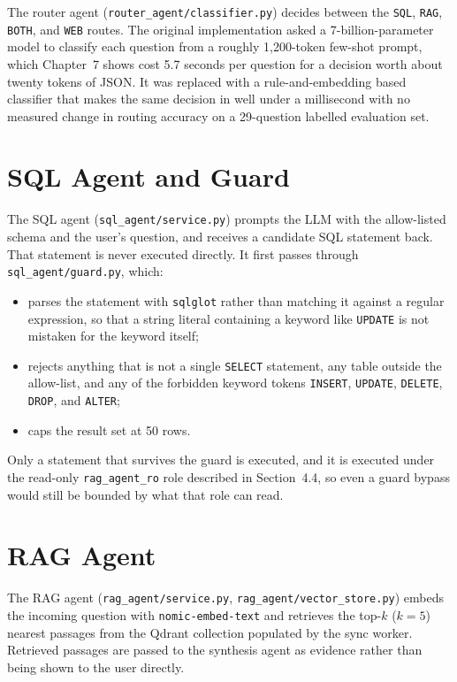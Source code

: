 \documentclass[11pt,a4paper,oneside]{report}
\begin{document}
The router agent (\texttt{router\_agent/classifier.py}) decides between the
\texttt{SQL}, \texttt{RAG}, \texttt{BOTH}, and \texttt{WEB} routes. The
original implementation asked a 7-billion-parameter model to classify each
question from a roughly 1,200-token few-shot prompt, which Chapter~7 shows
cost 5.7 seconds per question for a decision worth about twenty tokens of
JSON. It was replaced with a rule-and-embedding based classifier that makes
the same decision in well under a millisecond with no measured change in
routing accuracy on a 29-question labelled evaluation set.

\section{SQL Agent and Guard}

The SQL agent (\texttt{sql\_agent/service.py}) prompts the LLM with the
allow-listed schema and the user's question, and receives a candidate SQL
statement back. That statement is never executed directly. It first passes
through \texttt{sql\_agent/guard.py}, which:

\begin{itemize}[leftmargin=1.5em]
\item parses the statement with \texttt{sqlglot} rather than matching it
      against a regular expression, so that a string literal containing a
      keyword like \texttt{UPDATE} is not mistaken for the keyword itself;
\item rejects anything that is not a single \texttt{SELECT} statement, any
      table outside the allow-list, and any of the forbidden keyword tokens
      \texttt{INSERT}, \texttt{UPDATE}, \texttt{DELETE}, \texttt{DROP}, and
      \texttt{ALTER};
\item caps the result set at 50 rows.
\end{itemize}

Only a statement that survives the guard is executed, and it is executed
under the read-only \texttt{rag\_agent\_ro} role described in Section~4.4, so
even a guard bypass would still be bounded by what that role can read.

\section{RAG Agent}

The RAG agent (\texttt{rag\_agent/service.py},
\texttt{rag\_agent/vector\_store.py}) embeds the incoming question with
\texttt{nomic-embed-text} and retrieves the top-$k$ ($k=5$) nearest passages
from the Qdrant collection populated by the sync worker. Retrieved passages
are passed to the synthesis agent as evidence rather than being shown to the
user directly.
\end{document}
